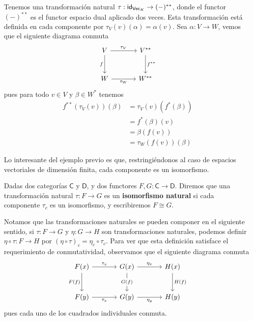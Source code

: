 \documentclass[../main.tex]{subfiles}
\begin{document}
\begin{exampleap}
    Tenemos una transformaci\'on natural $\tau: \idfunc[\mathsf{Vec}_K] \to (-)^{**}$, donde el functor $(-)^{**}$ es el functor espacio dual aplicado dos veces.
    Esta transformaci\'on est\'a definida en cada componente por $\tau_V(v)(\alpha) = \alpha(v)$.
    Sea $\alpha: V \to W$, vemos que el siguiente diagrama conmuta
    \[\begin{tikzcd}[row sep=large,column sep=large]
            {V} & {V^{**}} \\
            {W} & {W^{**}}
            \arrow["{\tau_V}", from=1-1, to=1-2]
            \arrow["{f^{**}}", from=1-2, to=2-2]
            \arrow["{\tau_W}"', from=2-1, to=2-2]
            \arrow["{f}"', from=1-1, to=2-1]
        \end{tikzcd}\]
    pues para todo $v \in V$ y $\beta \in W^{*}$ tenemos
    \begin{align*}
        f^{**}(\tau_V(v))(\beta) & = \tau_V(v)(f^*(\beta)) \\
                                 & = f^*(\beta)(v)         \\
                                 & = \beta(f(v))           \\
                                 & = \tau_W(f(v))(\beta)
    \end{align*}
\end{exampleap}

Lo interesante del ejemplo previo es que, restringi\'endonos al caso de espacios vectoriales de dimensi\'on finita, cada componente es un isomorfismo.

\begin{definitionap}
    Dadas dos categor\'ias $\mathsf{C}$ y $\mathsf{D}$, y dos functores $F,G:\mathsf{C} \to \mathsf{D}$. Diremos que una transformación natural $\tau:F \to G$ es un \textbf{isomorfismo natural} si cada componente $\tau_c$ es un isomorfismo, y escribiremos $F \cong G$.
\end{definitionap}

Notamos que las transformaciones naturales se pueden componer en el siguiente sentido,
si $\tau: F \to G$ y $\eta: G \to H$ son transformaciones naturales, podemos definir $\eta \circ \tau : F \to H$ por $(\eta \circ \tau)_c = \eta_c \circ \tau_c$. Para ver que esta definici\'on satisface el requerimiento de conmutatividad, observamos que el siguiente diagrama conmuta
\[\begin{tikzcd}[row sep=large,column sep=large]
        {F(x)} & {G(x)} & {H(x)} \\
        {F(y)} & {G(y)} & {H(y)}
        \arrow["{F(f)}"', from=1-1, to=2-1]
        \arrow["{\tau_x}"', from=2-1, to=2-2]
        \arrow["{\tau_x}", from=1-1, to=1-2]
        \arrow["{G(f)}"{description}, from=1-2, to=2-2]
        \arrow["{\eta_x}", from=1-2, to=1-3]
        \arrow["{H(f)}", from=1-3, to=2-3]
        \arrow["{\eta_y}"', from=2-2, to=2-3]
    \end{tikzcd}\]
pues cada uno de los cuadrados individuales conmuta.
\end{document}
